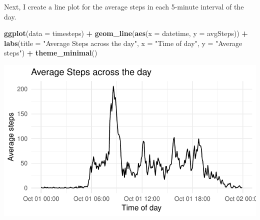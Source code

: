 \documentclass[]{article}
\newenvironment{Shaded}{\begin{snugshade}}{\end{snugshade}}
\newcommand{\KeywordTok}[1]{\textcolor[rgb]{0.13,0.29,0.53}{\textbf{#1}}}
\newcommand{\DataTypeTok}[1]{\textcolor[rgb]{0.13,0.29,0.53}{#1}}
\newcommand{\DecValTok}[1]{\textcolor[rgb]{0.00,0.00,0.81}{#1}}
\newcommand{\StringTok}[1]{\textcolor[rgb]{0.31,0.60,0.02}{#1}}
\newcommand{\CommentTok}[1]{\textcolor[rgb]{0.56,0.35,0.01}{\textit{#1}}}
\newcommand{\OtherTok}[1]{\textcolor[rgb]{0.56,0.35,0.01}{#1}}
\newcommand{\OperatorTok}[1]{\textcolor[rgb]{0.81,0.36,0.00}{\textbf{#1}}}
\newcommand{\NormalTok}[1]{#1}
\begin{document}
\begin{Shaded}
\end{Shaded}

Next, I create a line plot for the average steps in each 5-minute
interval of the day.

\begin{Shaded}
\begin{Highlighting}[]
\KeywordTok{ggplot}\NormalTok{(}\DataTypeTok{data =}\NormalTok{ timesteps) }\OperatorTok{+}
\StringTok{  }\KeywordTok{geom_line}\NormalTok{(}\KeywordTok{aes}\NormalTok{(}\DataTypeTok{x =}\NormalTok{ datetime, }\DataTypeTok{y =}\NormalTok{ avgSteps)) }\OperatorTok{+}
\StringTok{  }\KeywordTok{labs}\NormalTok{(}\DataTypeTok{title =} \StringTok{"Average Steps across the day"}\NormalTok{,}
       \DataTypeTok{x =} \StringTok{"Time of day"}\NormalTok{, }
       \DataTypeTok{y =} \StringTok{"Average steps"}\NormalTok{) }\OperatorTok{+}
\StringTok{      }\KeywordTok{theme_minimal}\NormalTok{()}
\end{Highlighting}
\end{Shaded}

\includegraphics{PA1_template_files/figure-latex/plotts-1.pdf}
\end{document}
